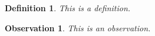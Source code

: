 \documentclass{article}
\newtheorem{Obs}{Observation}
\newtheorem{definition}{Definition}
\newenvironment{df}{\begin{definition}\rm}{\end{definition}}
\newenvironment{obs}{\begin{Obs}\rm}{\end{Obs}}
\begin{document}
\begin{df}This is a definition.\end{df}
\begin{obs}This is an observation.\end{obs}
\end{document}
